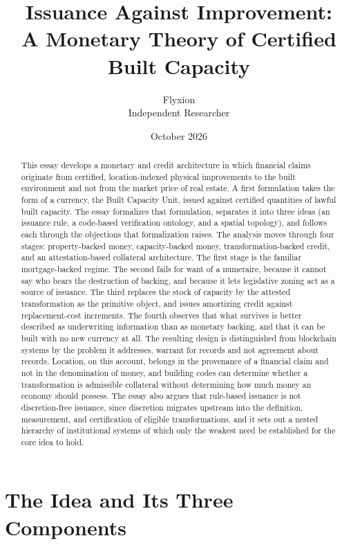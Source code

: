 \documentclass[11pt]{article}
\title{Issuance Against Improvement:\\A Monetary Theory of Certified Built Capacity}
\author{Flyxion\\\small Independent Researcher}
\date{October 2026}
\theoremstyle{definition}
\begin{document}
\maketitle

\begin{abstract}
\noindent This essay develops a monetary and credit architecture in which financial claims originate from certified, location-indexed physical improvements to the built environment and not from the market price of real estate. A first formulation takes the form of a currency, the Built Capacity Unit, issued against certified quantities of lawful built capacity. The essay formalizes that formulation, separates it into three ideas (an issuance rule, a code-based verification ontology, and a spatial topology), and follows each through the objections that formalization raises. The analysis moves through four stages: property-backed money, capacity-backed money, transformation-backed credit, and an attestation-based collateral architecture. The first stage is the familiar mortgage-backed regime. The second fails for want of a numeraire, because it cannot say who bears the destruction of backing, and because it lets legislative zoning act as a source of issuance. The third replaces the stock of capacity by the attested transformation as the primitive object, and issues amortizing credit against replacement-cost increments. The fourth observes that what survives is better described as underwriting information than as monetary backing, and that it can be built with no new currency at all. The resulting design is distinguished from blockchain systems by the problem it addresses, warrant for records and not agreement about records. Location, on this account, belongs in the provenance of a financial claim and not in the denomination of money, and building codes can determine whether a transformation is admissible collateral without determining how much money an economy should possess. The essay also argues that rule-based issuance is not discretion-free issuance, since discretion migrates upstream into the definition, measurement, and certification of eligible transformations, and it sets out a nested hierarchy of institutional systems of which only the weakest need be established for the core idea to hold.
\end{abstract}

\section{The Idea and Its Three Components}
\end{document}
